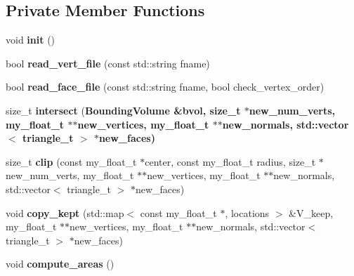 \subsection*{Private Member Functions}
\begin{CompactItemize}
\item 
void \textbf{init} ()\label{classASCbase_1_1SimpleTrimesh_0e5578ec2f86102a488219ec4765636c}

\item 
bool \textbf{read\_\-vert\_\-file} (const std::string fname)\label{classASCbase_1_1SimpleTrimesh_817b22c2555bee30b2c3a08669e3ba46}

\item 
bool \textbf{read\_\-face\_\-file} (const std::string fname, bool check\_\-vertex\_\-order)\label{classASCbase_1_1SimpleTrimesh_45339d3843bd2b4c17ad571eb3622a9c}

\item 
size\_\-t \textbf{intersect} (\bf{Bounding\-Volume} \&bvol, size\_\-t $\ast$new\_\-num\_\-verts, my\_\-float\_\-t $\ast$$\ast$new\_\-vertices, my\_\-float\_\-t $\ast$$\ast$new\_\-normals, std::vector$<$ triangle\_\-t $>$ $\ast$new\_\-faces)\label{classASCbase_1_1SimpleTrimesh_e63a3ebc10e0983b60504e799992d7c6}

\item 
size\_\-t \textbf{clip} (const my\_\-float\_\-t $\ast$center, const my\_\-float\_\-t radius, size\_\-t $\ast$new\_\-num\_\-verts, my\_\-float\_\-t $\ast$$\ast$new\_\-vertices, my\_\-float\_\-t $\ast$$\ast$new\_\-normals, std::vector$<$ triangle\_\-t $>$ $\ast$new\_\-faces)\label{classASCbase_1_1SimpleTrimesh_8dc60bdfb5cd7102b5fe52ed0a2afb31}

\item 
void \textbf{copy\_\-kept} (std::map$<$ const my\_\-float\_\-t $\ast$, locations $>$ \&V\_\-keep, my\_\-float\_\-t $\ast$$\ast$new\_\-vertices, my\_\-float\_\-t $\ast$$\ast$new\_\-normals, std::vector$<$ triangle\_\-t $>$ $\ast$new\_\-faces)\label{classASCbase_1_1SimpleTrimesh_a584badfab426f5b183a103b4082186b}

\item 
void \textbf{compute\_\-areas} ()\label{classASCbase_1_1SimpleTrimesh_7ae5091189436be2401d74ada2f49349}

\end{CompactItemize}
